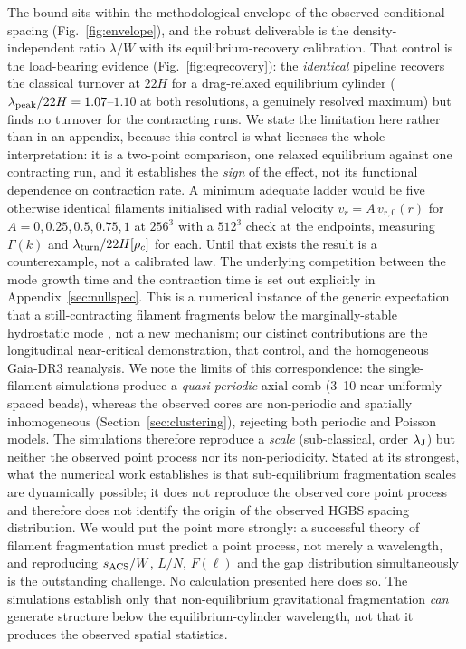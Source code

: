 \documentclass[usenatbib,twoside,twocolumn]{mnras}
\begin{document}
The bound sits within the methodological envelope of the observed conditional spacing (Fig.~\ref{fig:envelope}), and the robust deliverable is the density-independent ratio $\lambda/W$ with its equilibrium-recovery calibration. That control is the load-bearing evidence (Fig.~\ref{fig:eqrecovery}): the \emph{identical} pipeline recovers the classical turnover at $22H$ for a drag-relaxed equilibrium cylinder ($\lambda_{\rm peak}/22H=1.07$--$1.10$ at both resolutions, a genuinely resolved maximum) but finds no turnover for the contracting runs. We state the limitation here rather than in an appendix, because this control is what licenses the whole interpretation: it is a two-point comparison, one relaxed equilibrium against one contracting run, and it establishes the \emph{sign} of the effect, not its functional dependence on contraction rate. A minimum adequate ladder would be five otherwise identical filaments initialised with radial velocity $v_r=A\,v_{r,0}(r)$ for $A=0,0.25,0.5,0.75,1$ at $256^3$ with a $512^3$ check at the endpoints, measuring $\Gamma(k)$ and $\lambda_{\rm turn}/22H[\rho_c]$ for each. Until that exists the result is a counterexample, not a calibrated law. The underlying competition between the mode growth time and the contraction time is set out explicitly in Appendix~\ref{sec:nullspec}. This is a numerical instance of the generic expectation that a still-contracting filament fragments below the marginally-stable hydrostatic mode \citep{Clarke2016,Clarke2017,Clarke2020}, not a new mechanism; our distinct contributions are the longitudinal near-critical demonstration, that control, and the homogeneous Gaia-DR3 reanalysis. We note the limits of this correspondence: the single-filament simulations produce a \emph{quasi-periodic} axial comb (3--10 near-uniformly spaced beads), whereas the observed cores are non-periodic and spatially inhomogeneous (Section~\ref{sec:clustering}), rejecting both periodic and Poisson models. The simulations therefore reproduce a \emph{scale} (sub-classical, order $\lambda_{\rm J}$) but neither the observed point process nor its non-periodicity. Stated at its strongest, what the numerical work establishes is that sub-equilibrium fragmentation scales are dynamically possible; it does not reproduce the observed core point process and therefore does not identify the origin of the observed HGBS spacing distribution. We would put the point more strongly: a successful theory of filament fragmentation must predict a point process, not merely a wavelength, and reproducing $s_{\rm ACS}/W$, $L/N$, $F(\ell)$ and the gap distribution simultaneously is the outstanding challenge. No calculation presented here does so. The simulations establish only that non-equilibrium gravitational fragmentation \emph{can} generate structure below the equilibrium-cylinder wavelength, not that it produces the observed spatial statistics.
\end{document}
